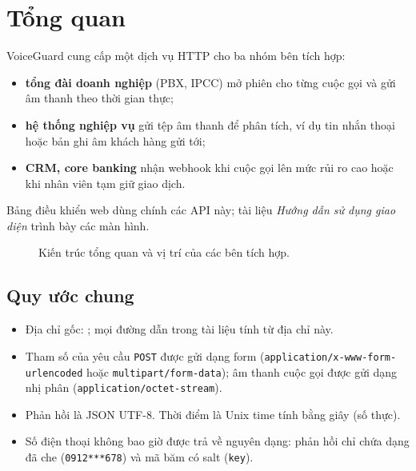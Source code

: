 \documentclass[11pt]{article}
\begin{document}

\tableofcontents
\clearpage

\section{Tổng quan}

VoiceGuard cung cấp một dịch vụ HTTP cho ba nhóm bên tích hợp:
\begin{itemize}
  \item \textbf{tổng đài doanh nghiệp} (PBX, IPCC) mở phiên cho từng cuộc gọi và gửi âm thanh theo thời gian thực;
  \item \textbf{hệ thống nghiệp vụ} gửi tệp âm thanh để phân tích, ví dụ tin nhắn thoại hoặc bản ghi âm khách hàng gửi tới;
  \item \textbf{CRM, core banking} nhận webhook khi cuộc gọi lên mức rủi ro cao hoặc khi nhân viên tạm giữ giao dịch.
\end{itemize}
Bảng điều khiển web dùng chính các API này; tài liệu \emph{Hướng dẫn sử dụng giao diện} trình bày các màn hình.

\begin{figure}[tbp]
  \centering
  \resizebox{\linewidth}{!}{}
  \caption{Kiến trúc tổng quan và vị trí của các bên tích hợp.}
  \label{fig:arch}
\end{figure}

\subsection{Quy ước chung}

\begin{itemize}
  \item Địa chỉ gốc: ; mọi đường dẫn trong tài liệu tính từ địa chỉ này.
  \item Tham số của yêu cầu \texttt{POST} được gửi dạng form (\texttt{application/x-www-form-urlencoded} hoặc \texttt{multipart/form-data}); âm thanh cuộc gọi được gửi dạng nhị phân (\texttt{application/octet-stream}).
  \item Phản hồi là JSON UTF-8. Thời điểm là Unix time tính bằng giây (số thực).
  \item Số điện thoại không bao giờ được trả về nguyên dạng: phản hồi chỉ chứa dạng đã che (\texttt{0912***678}) và mã băm có salt (\texttt{key}).
\end{itemize}
\end{document}
